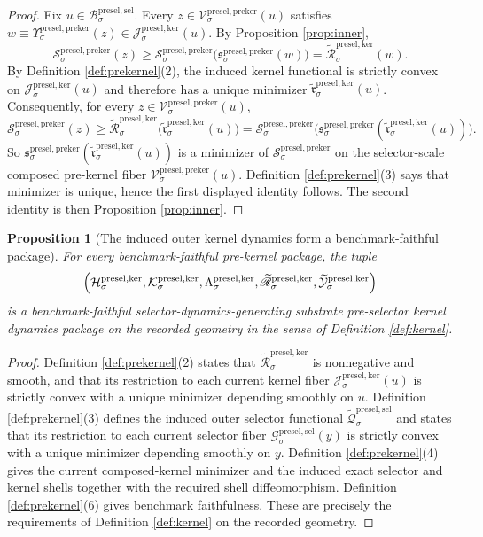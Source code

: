 \documentclass[11pt]{article}
\newcommand{\PreSectionSelectorBody}[1]{\mathcal B_{#1}^{\mathrm{presel,sel}}}
\newcommand{\PreSectionSelectorFiber}[2]{\mathcal G_{#1}^{\mathrm{presel,sel}}(#2)}
\newcommand{\KernelSpace}[1]{\mathcal H_{#1}^{\mathrm{presel,ker}}}
\newcommand{\KernelBody}[1]{\mathcal K_{#1}^{\mathrm{presel,ker}}}
\newcommand{\KernelProj}[1]{\Lambda_{#1}^{\mathrm{presel,ker}}}
\newcommand{\KernelFiber}[2]{\mathcal J_{#1}^{\mathrm{presel,ker}}(#2)}
\newcommand{\PreKernelProj}[1]{\Upsilon_{#1}^{\mathrm{presel,preker}}}
\newcommand{\PreKernelFunctional}[1]{\mathscr S_{#1}^{\mathrm{presel,preker}}}
\newcommand{\PreKernelMinLift}[1]{\mathfrak s_{#1}^{\mathrm{presel,preker}}}
\newcommand{\PreKernelComposedFiber}[2]{\mathcal V_{#1}^{\mathrm{presel,preker}}(#2)}
\newcommand{\InducedSelectorFunctional}[1]{\widetilde{\mathscr Q}_{#1}^{\mathrm{presel,sel}}}
\newcommand{\InducedKernelFunctional}[1]{\widetilde{\mathscr R}_{#1}^{\mathrm{presel,ker}}}
\newcommand{\InducedKernelMinLift}[1]{\widetilde{\mathfrak r}_{#1}^{\mathrm{presel,ker}}}
\newcommand{\InducedKernelShell}[1]{\widetilde{\mathcal Y}_{#1}^{\mathrm{presel,ker}}}
\newtheorem{proposition}{Proposition}
\begin{document}
\begin{proof}
Fix \(u\in\PreSectionSelectorBody{\sigma}\). Every \(z\in\PreKernelComposedFiber{\sigma}{u}\) satisfies \(w\equiv\PreKernelProj{\sigma}(z)\in\KernelFiber{\sigma}{u}\). By Proposition \ref{prop:inner},
\[
\PreKernelFunctional{\sigma}(z)
\geq
\PreKernelFunctional{\sigma}\bigl(\PreKernelMinLift{\sigma}(w)\bigr)
=
\InducedKernelFunctional{\sigma}(w).
\]
By Definition \ref{def:prekernel}(2), the induced kernel functional is strictly convex on \(\KernelFiber{\sigma}{u}\) and therefore has a unique minimizer \(\InducedKernelMinLift{\sigma}(u)\). Consequently, for every \(z\in\PreKernelComposedFiber{\sigma}{u}\),
\[
\PreKernelFunctional{\sigma}(z)
\geq
\InducedKernelFunctional{\sigma}\bigl(\InducedKernelMinLift{\sigma}(u)\bigr)
=
\PreKernelFunctional{\sigma}\bigl(\PreKernelMinLift{\sigma}(\InducedKernelMinLift{\sigma}(u))\bigr).
\]
So \(\PreKernelMinLift{\sigma}(\InducedKernelMinLift{\sigma}(u))\) is a minimizer of \(\PreKernelFunctional{\sigma}\) on the selector-scale composed pre-kernel fiber \(\PreKernelComposedFiber{\sigma}{u}\). Definition \ref{def:prekernel}(3) says that minimizer is unique, hence the first displayed identity follows. The second identity is then Proposition \ref{prop:inner}.
\end{proof}

\begin{proposition}[The induced outer kernel dynamics form a benchmark-faithful package]
\label{prop:kernel}
For every benchmark-faithful pre-kernel package, the tuple
\[
\Bigl(
\KernelSpace{\sigma},
\KernelBody{\sigma},
\KernelProj{\sigma},
\InducedKernelFunctional{\sigma},
\InducedKernelShell{\sigma}
\Bigr)
\]
is a benchmark-faithful selector-dynamics-generating substrate pre-selector kernel dynamics package on the recorded geometry in the sense of Definition \ref{def:kernel}.
\end{proposition}

\begin{proof}
Definition \ref{def:prekernel}(2) states that \(\InducedKernelFunctional{\sigma}\) is nonnegative and smooth, and that its restriction to each current kernel fiber \(\KernelFiber{\sigma}{u}\) is strictly convex with a unique minimizer depending smoothly on \(u\). Definition \ref{def:prekernel}(3) defines the induced outer selector functional \(\InducedSelectorFunctional{\sigma}\) and states that its restriction to each current selector fiber \(\PreSectionSelectorFiber{\sigma}{y}\) is strictly convex with a unique minimizer depending smoothly on \(y\). Definition \ref{def:prekernel}(4) gives the current composed-kernel minimizer and the induced exact selector and kernel shells together with the required shell diffeomorphism. Definition \ref{def:prekernel}(6) gives benchmark faithfulness. These are precisely the requirements of Definition \ref{def:kernel} on the recorded geometry.
\end{proof}
\end{document}
